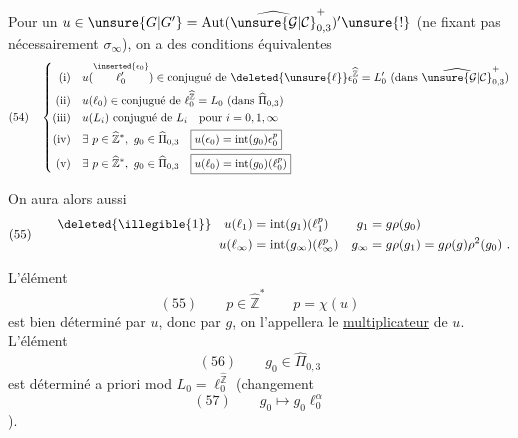 Pour un $u\in\unsure{G|G'}=\operatorname{Aut}(\widehat{\unsure{\mathcal{G}|\mathcal{C}}}_{0,3}^{+})'\unsure{!}$ (ne fixant pas nécessairement $\sigma_\infty$), on a des conditions équivalentes
\[
(54)\quad
\left\{\begin{aligned}
\text{(i)}\quad &u(\overset{\inserted{\epsilon_0}}{\ell'_0})\in\text{conjugué de }\deleted{\unsure{\ell}}\epsilon_0^{\widehat{\mathbb Z}}=L'_0\ (\text{dans }\widehat{\unsure{\mathcal{G}|\mathcal{C}}}_{0,3}^{+})\\
\text{(ii)}\quad &u(\ell_0)\in\text{conjugué de }\ell_0^{\widehat{\mathbb Z}}=L_0\ (\text{dans }\widehat{\Pi}_{0,3})\\
\text{(iii)}\quad &u(L_i)\text{ conjugué de }L_i\quad\text{pour }i=0,1,\infty\\
\text{(iv)}\quad &\exists\ p\in\widehat{\mathbb Z}^{\ast},\ g_0\in\widehat{\Pi}_{0,3}\quad
\boxed{u(\epsilon_0)=\operatorname{int}(g_0)\epsilon_0^p}\\
\text{(v)}\quad &\exists\ p\in\widehat{\mathbb Z}^{\ast},\ g_0\in\widehat{\Pi}_{0,3}\quad
\boxed{u(\ell_0)=\operatorname{int}(g_0)(\ell_0^p)}
\end{aligned}\right.
\]

On aura alors aussi
\[
(55)\qquad
\begin{aligned}
\deleted{\illegible{1}}\quad u(\ell_1)&=\operatorname{int}(g_1)(\ell_1^p)&
g_1&=g\rho(g_0)\\
u(\ell_\infty)&=\operatorname{int}(g_\infty)(\ell_\infty^p)&
g_\infty&=g\rho(g_1)=g\rho(g)\rho^2(g_0)\ .
\end{aligned}
\]

L'élément 
\[
(55)\qquad p\in\widehat{\mathbb Z}^{\ast}\qquad p=\chi(u)
\]
est bien déterminé par $u$, donc par $g$, on l'appellera le \uline{multiplicateur} de $u$. L'élément 
\[
(56)\qquad g_0\in\widehat{\Pi}_{0,3}
\]
est déterminé a priori mod $L_0=\ell_0^{\widehat{\mathbb Z}}$ (changement
\[
(57)\qquad g_0\longmapsto g_0\ell_0^\alpha
\]
).



